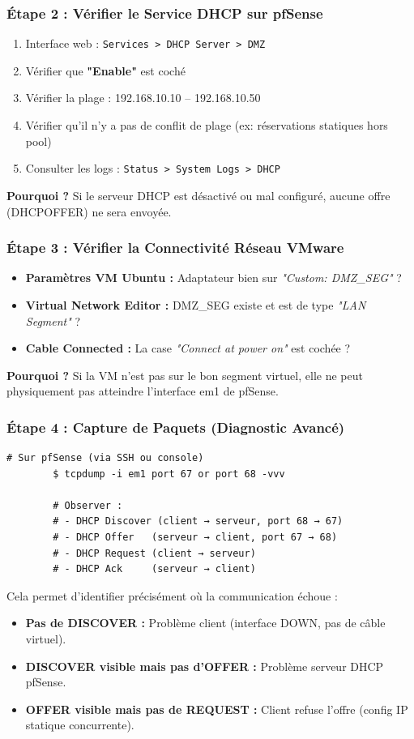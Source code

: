\documentclass[12pt,a4paper,openany]{report}
\begin{document}
	\subsubsection{Étape 2 : Vérifier le Service DHCP sur pfSense}
	\begin{enumerate}
		\item Interface web : \texttt{Services > DHCP Server > DMZ}
		\item Vérifier que \textbf{"Enable"} est coché
		\item Vérifier la plage : 192.168.10.10 -- 192.168.10.50
		\item Vérifier qu'il n'y a pas de conflit de plage (ex: réservations statiques hors pool)
		\item Consulter les logs : \texttt{Status > System Logs > DHCP}
	\end{enumerate}
	\textbf{Pourquoi ?} Si le serveur DHCP est désactivé ou mal configuré, aucune offre (DHCPOFFER) ne sera envoyée.
	
	\subsubsection{Étape 3 : Vérifier la Connectivité Réseau VMware}
	\begin{itemize}
		\item \textbf{Paramètres VM Ubuntu :} Adaptateur bien sur \textit{"Custom: DMZ\_SEG"} ?
		\item \textbf{Virtual Network Editor :} DMZ\_SEG existe et est de type \textit{"LAN Segment"} ?
		\item \textbf{Cable Connected :} La case \textit{"Connect at power on"} est cochée ?
	\end{itemize}
	\textbf{Pourquoi ?} Si la VM n'est pas sur le bon segment virtuel, elle ne peut physiquement pas atteindre l'interface em1 de pfSense.
	
	\subsubsection{Étape 4 : Capture de Paquets (Diagnostic Avancé)}
	\begin{lstlisting}[caption=Analyse DHCP avec tcpdump sur pfSense]
		# Sur pfSense (via SSH ou console)
		$ tcpdump -i em1 port 67 or port 68 -vvv
		
		# Observer :
		# - DHCP Discover (client → serveur, port 68 → 67)
		# - DHCP Offer   (serveur → client, port 67 → 68)
		# - DHCP Request (client → serveur)
		# - DHCP Ack     (serveur → client)
	\end{lstlisting}
	Cela permet d'identifier précisément où la communication échoue :
	\begin{itemize}
		\item \textbf{Pas de DISCOVER :} Problème client (interface DOWN, pas de câble virtuel).
		\item \textbf{DISCOVER visible mais pas d'OFFER :} Problème serveur DHCP pfSense.
		\item \textbf{OFFER visible mais pas de REQUEST :} Client refuse l'offre (config IP statique concurrente).
	\end{itemize}
	
\end{document}

